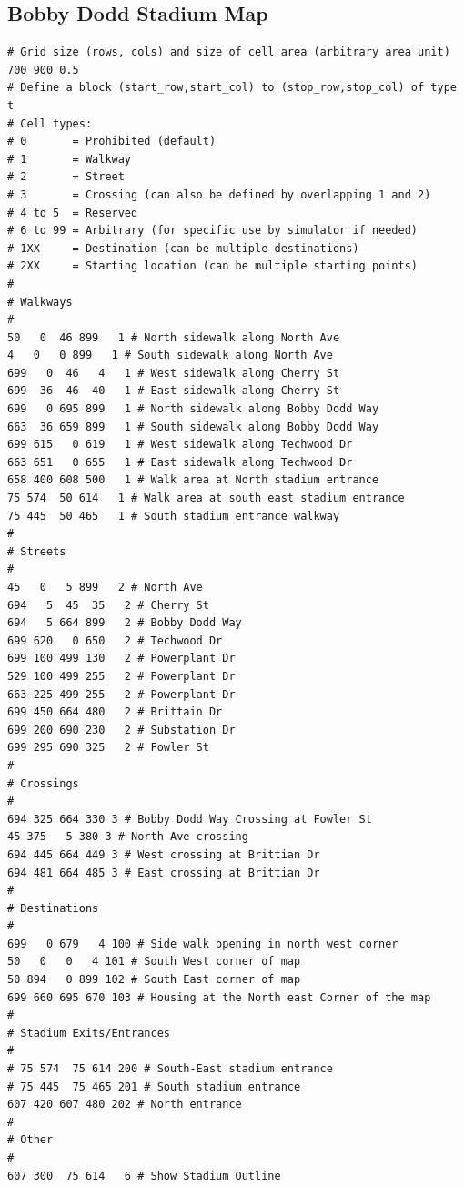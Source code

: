 \documentclass[paper=a4, fontsize=11pt]{scrartcl}
\numberwithin{equation}{section}		%
\numberwithin{figure}{section}			%
\numberwithin{table}{section}		    %
\begin{document}
\begin{appendices}
\subsection{Bobby Dodd Stadium Map}
\begin{verbatim}
# Grid size (rows, cols) and size of cell area (arbitrary area unit)
700 900 0.5
# Define a block (start_row,start_col) to (stop_row,stop_col) of type t
# Cell types:
# 0       = Prohibited (default)
# 1       = Walkway
# 2       = Street
# 3       = Crossing (can also be defined by overlapping 1 and 2)
# 4 to 5  = Reserved
# 6 to 99 = Arbitrary (for specific use by simulator if needed)
# 1XX     = Destination (can be multiple destinations)
# 2XX     = Starting location (can be multiple starting points)
#
# Walkways
#
50   0  46 899   1 # North sidewalk along North Ave
4   0   0 899   1 # South sidewalk along North Ave
699   0  46   4   1 # West sidewalk along Cherry St
699  36  46  40   1 # East sidewalk along Cherry St
699   0 695 899   1 # North sidewalk along Bobby Dodd Way
663  36 659 899   1 # South sidewalk along Bobby Dodd Way
699 615   0 619   1 # West sidewalk along Techwood Dr
663 651   0 655   1 # East sidewalk along Techwood Dr
658 400 608 500   1 # Walk area at North stadium entrance
75 574  50 614   1 # Walk area at south east stadium entrance
75 445  50 465   1 # South stadium entrance walkway
#
# Streets
#
45   0   5 899   2 # North Ave
694   5  45  35   2 # Cherry St
694   5 664 899   2 # Bobby Dodd Way
699 620   0 650   2 # Techwood Dr
699 100 499 130   2 # Powerplant Dr
529 100 499 255   2 # Powerplant Dr
663 225 499 255   2 # Powerplant Dr
699 450 664 480   2 # Brittain Dr
699 200 690 230   2 # Substation Dr
699 295 690 325   2 # Fowler St
#
# Crossings
#
694 325 664 330 3 # Bobby Dodd Way Crossing at Fowler St
45 375   5 380 3 # North Ave crossing
694 445 664 449 3 # West crossing at Brittian Dr
694 481 664 485 3 # East crossing at Brittian Dr
#
# Destinations
#
699   0 679   4 100 # Side walk opening in north west corner
50   0   0   4 101 # South West corner of map
50 894   0 899 102 # South East corner of map
699 660 695 670 103 # Housing at the North east Corner of the map
#
# Stadium Exits/Entrances
#
# 75 574  75 614 200 # South-East stadium entrance
# 75 445  75 465 201 # South stadium entrance
607 420 607 480 202 # North entrance
#
# Other
#
607 300  75 614   6 # Show Stadium Outline
\end{verbatim}


\end{appendices}
\end{document}
